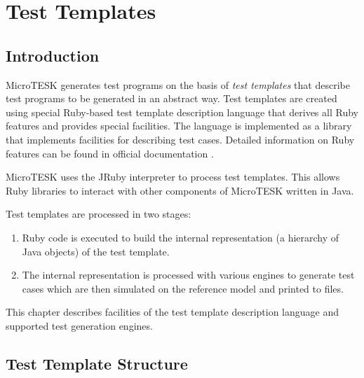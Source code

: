 \documentclass[oneside,final,12pt]{extreport}
\begin{document}

\chapter{Test Templates}


\section{Introduction}

MicroTESK generates test programs on the basis of \emph{test templates} that describe
test programs to be generated in an abstract way. Test templates are created using
special Ruby-based test template description language that derives all Ruby features
and provides special facilities. The language is implemented as a library that
implements facilities for describing test cases. Detailed information on Ruby
features can be found in official documentation \cite{ruby-site, ruby-matz}.

MicroTESK uses the JRuby \cite{jruby-site} interpreter to process test templates.
This allows Ruby libraries to interact with other components of MicroTESK written in Java.

Test templates are processed in two stages:
\begin{enumerate}
\item \label{ttp_stage_1} Ruby code is executed to build the internal representation (a hierarchy
      of Java objects) of the test template.
\item \label{ttp_stage_2} The internal representation is processed with various engines to 
      generate test cases which are then simulated on the reference model and printed to files.
\end{enumerate}

This chapter describes facilities of the test template description language and supported test
generation engines.



\section{Test Template Structure}
\end{document}
